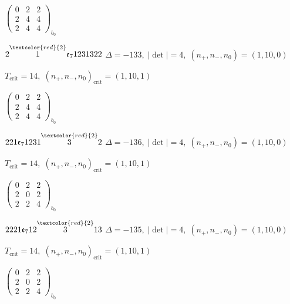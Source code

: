 \documentclass[10pt]{article}
\begin{document}
\hspace{2em}$\left(\begin{smallmatrix}0 & 2 & 2 \\ 2 & 4 & 4 \\ 2 & 4 & 4\end{smallmatrix}\right)_{\!b_0}$

\smallskip

$2\overset{\textcolor{red}{2}}{1}\mathfrak{e}_71231322$ \quad $\Delta=-133,\; |\det|=4,\; (n_+,n_-,n_0)=(1,10,0)$

\hspace{1em}$T_{\text{crit}}=14,\; (n_+,n_-,n_0)_{\text{crit}}=(1,10,1)$

\hspace{2em}$\left(\begin{smallmatrix}0 & 2 & 2 \\ 2 & 4 & 4 \\ 2 & 4 & 4\end{smallmatrix}\right)_{\!b_0}$

\smallskip

$221\mathfrak{e}_71231\overset{\textcolor{red}{2}}{3}2$ \quad $\Delta=-136,\; |\det|=4,\; (n_+,n_-,n_0)=(1,10,0)$

\hspace{1em}$T_{\text{crit}}=14,\; (n_+,n_-,n_0)_{\text{crit}}=(1,10,1)$

\hspace{2em}$\left(\begin{smallmatrix}0 & 2 & 2 \\ 2 & 0 & 2 \\ 2 & 2 & 4\end{smallmatrix}\right)_{\!b_0}$

\smallskip

$2221\mathfrak{e}_712\overset{\textcolor{red}{2}}{3}13$ \quad $\Delta=-135,\; |\det|=4,\; (n_+,n_-,n_0)=(1,10,0)$

\hspace{1em}$T_{\text{crit}}=14,\; (n_+,n_-,n_0)_{\text{crit}}=(1,10,1)$

\hspace{2em}$\left(\begin{smallmatrix}0 & 2 & 2 \\ 2 & 0 & 2 \\ 2 & 2 & 4\end{smallmatrix}\right)_{\!b_0}$
\end{document}
